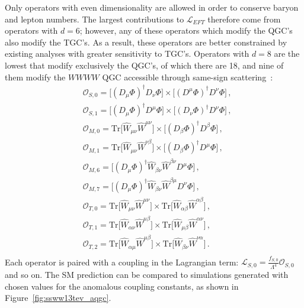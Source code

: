 Only operators with even dimensionality are allowed in order to conserve baryon and lepton numbers.
The largest contributions to $\mathcal{L}_{EFT}$ therefore come from operators with $d=6$; however, any of these operators which modify the QGC's also modify the TGC's.
As a result, these operators are better constrained by existing analyses with greater sensitivity to TGC's.
Operators with $d=8$ are the lowest that modify exclusively the QGC's, of which there are 18, and nine of them modify the $WWWW$ QGC accessible through same-sign \sswwnojj scattering~\cite{2006.aqgc-at-lhc, 2013.aqgc-mc}:
\begin{equation}
  \begin{aligned}
    &\mathcal{O}_{S,0} = \big[(D_\mu\Phi)^\dagger D_\nu\Phi\big]\times\big[(D^\mu\Phi)^\dagger D^\nu\Phi\big]\,,\\
    &\mathcal{O}_{S,1} = \big[(D_\mu\Phi)^\dagger D^\mu\Phi\big]\times\big[(D_\nu\Phi)^\dagger D^\nu\Phi\big]\,,\\
    &\mathcal{O}_{M,0} = \textrm{Tr}\big[\hat{W}_{\mu\nu}\hat{W}^{\mu\nu}\big]\times\big[(D_\beta\Phi)^\dagger D^\beta\Phi\big]\,,\\
    &\mathcal{O}_{M,1} = \textrm{Tr}\big[\hat{W}_{\mu\nu}\hat{W}^{\nu\beta}\big]\times\big[(D_\beta\Phi)^\dagger D^\mu\Phi\big]\,,\\
    &\mathcal{O}_{M,6} = \big[(D_\mu\Phi)^\dagger\hat{W}_{\beta\nu}\hat{W}^{\beta\nu}D^\mu\Phi\big]\,,\\
    &\mathcal{O}_{M,7} = \big[(D_\mu\Phi)^\dagger\hat{W}_{\beta\nu}\hat{W}^{\beta\mu}D^\nu\Phi\big]\,,\\
    &\mathcal{O}_{T,0} = \textrm{Tr}\big[\hat{W}_{\mu\nu}\hat{W}^{\mu\nu}\big]\times\textrm{Tr}\big[\hat{W}_{\alpha\beta}\hat{W}^{\alpha\beta}\big]\,,\\
    &\mathcal{O}_{T,1} = \textrm{Tr}\big[\hat{W}_{\alpha\nu}\hat{W}^{\mu\beta}\big]\times\textrm{Tr}\big[\hat{W}_{\mu\beta}\hat{W}^{\alpha\nu}\big]\,,\\
    &\mathcal{O}_{T,2} = \textrm{Tr}\big[\hat{W}_{\alpha\mu}\hat{W}^{\mu\beta}\big]\times\textrm{Tr}\big[\hat{W}_{\beta\nu}\hat{W}^{\nu\alpha}\big]\,.\\
  \end{aligned}
  \label{eq:aqgc_dim8}
\end{equation}
Each operator is paired with a coupling in the Lagrangian term: $\mathcal{L}_{S,0} = \frac{f_{S,0}}{\Lambda^4}\mathcal{O}_{S,0}$ and so on.
The SM prediction can be compared to simulations generated with chosen values for the anomalous coupling constants, as shown in Figure~\ref{fig:ssww13tev_aqgc}.

